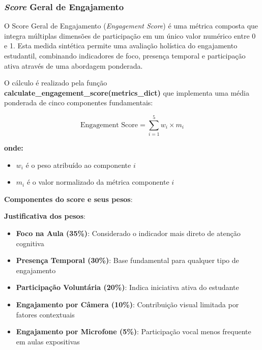 \subsubsection{\textit{Score} Geral de Engajamento}
O Score Geral de Engajamento (\textit{Engagement Score}) é uma métrica composta que integra múltiplas dimensões de participação em um único valor numérico entre 0 e 1. Esta medida sintética permite uma avaliação holística do engajamento estudantil, combinando indicadores de foco, presença temporal e participação ativa através de uma abordagem ponderada.

O cálculo é realizado pela função \textbf{calculate\_engagement\_score(metrics\_dict)} que implementa uma média ponderada de cinco componentes fundamentais:

\begin{equation}
\text{Engagement Score} = \sum_{i=1}^{5} w_i \times m_i
\end{equation}

\textbf{onde:}
\begin{itemize}
    \item $w_i$ é o peso atribuído ao componente $i$
    \item $m_i$ é o valor normalizado da métrica componente $i$
\end{itemize}

% 

\textbf{Componentes do score e seus pesos}:


\textbf{Justificativa dos pesos}:
\begin{itemize}
    \item \textbf{Foco na Aula (35\%)}: Considerado o indicador mais direto de atenção cognitiva
    \item \textbf{Presença Temporal (30\%)}: Base fundamental para qualquer tipo de engajamento
    \item \textbf{Participação Voluntária (20\%)}: Indica iniciativa ativa do estudante
    \item \textbf{Engajamento por Câmera (10\%)}: Contribuição visual limitada por fatores contextuais
    \item \textbf{Engajamento por Microfone (5\%)}: Participação vocal menos frequente em aulas expositivas
\end{itemize}


